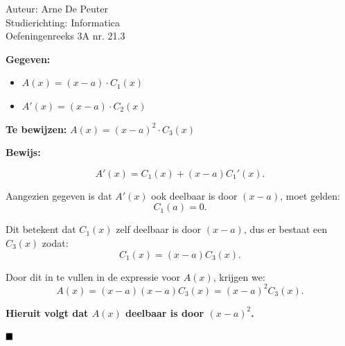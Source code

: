 \documentclass[a4paper]{article}
\begin{document}
\noindent \large Auteur: Arne De Peuter\\
\noindent \large Studierichting: Informatica\\
\noindent \large Oefeningenreeks 3A nr. 21.3\\

\medskip

\normalsize

\textbf{Gegeven:}
\begin{itemize}
    \item $A(x) = (x-a) \cdot C_1(x)$
    \item $A'(x) = (x-a) \cdot C_2(x)$
\end{itemize}

\textbf{Te bewijzen:} $A(x) = (x-a)^2 \cdot C_3(x)$

\medskip

\textbf{Bewijs:}

\[
A'(x) = C_1(x) + (x-a)C_1'(x).
\]

Aangezien gegeven is dat $A'(x)$ ook deelbaar is door $(x-a)$, moet gelden:
\[
C_1(a) = 0.
\]

Dit betekent dat $C_1(x)$ zelf deelbaar is door $(x-a)$, dus er bestaat een $C_3(x)$ zodat:
\[
C_1(x) = (x-a) C_3(x).
\]

Door dit in te vullen in de expressie voor $A(x)$, krijgen we:
\[
A(x) = (x-a)(x-a)C_3(x) = (x-a)^2 C_3(x).
\]

\textbf{Hieruit volgt dat $A(x)$ deelbaar is door $(x-a)^2$.}

$\hfill\blacksquare$
\end{document}
